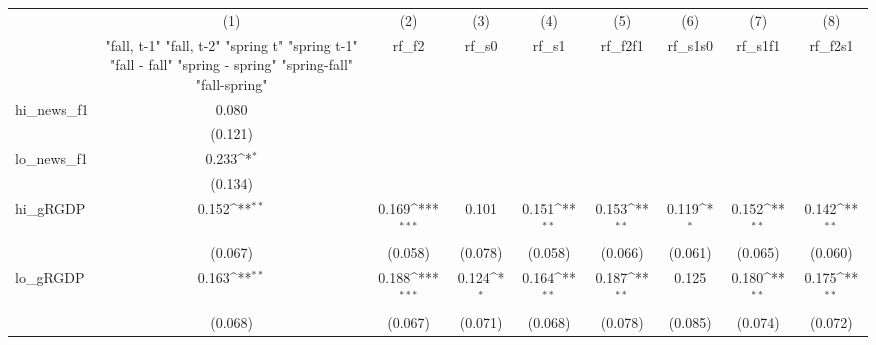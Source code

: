 {
\def\sym#1{\ifmmode^{#1}\else\(^{#1}\)\fi}
\begin{tabular}{l*{8}{c}}
\toprule
            &\multicolumn{1}{c}{(1)}&\multicolumn{1}{c}{(2)}&\multicolumn{1}{c}{(3)}&\multicolumn{1}{c}{(4)}&\multicolumn{1}{c}{(5)}&\multicolumn{1}{c}{(6)}&\multicolumn{1}{c}{(7)}&\multicolumn{1}{c}{(8)}\\
            &\multicolumn{1}{c}{  "fall, t-1" "fall, t-2" "spring t" "spring t-1"  "fall - fall" "spring - spring" "spring-fall" "fall-spring" }&\multicolumn{1}{c}{rf\_f2}&\multicolumn{1}{c}{rf\_s0}&\multicolumn{1}{c}{rf\_s1}&\multicolumn{1}{c}{rf\_f2f1}&\multicolumn{1}{c}{rf\_s1s0}&\multicolumn{1}{c}{rf\_s1f1}&\multicolumn{1}{c}{rf\_f2s1}\\
\midrule
hi\_news\_f1  &       0.080         &                     &                     &                     &                     &                     &                     &                     \\
            &     (0.121)         &                     &                     &                     &                     &                     &                     &                     \\
\addlinespace
lo\_news\_f1  &       0.233\sym{*}  &                     &                     &                     &                     &                     &                     &                     \\
            &     (0.134)         &                     &                     &                     &                     &                     &                     &                     \\
\addlinespace
hi\_gRGDP    &       0.152\sym{**} &       0.169\sym{***}&       0.101         &       0.151\sym{**} &       0.153\sym{**} &       0.119\sym{*}  &       0.152\sym{**} &       0.142\sym{**} \\
            &     (0.067)         &     (0.058)         &     (0.078)         &     (0.058)         &     (0.066)         &     (0.061)         &     (0.065)         &     (0.060)         \\
\addlinespace
lo\_gRGDP    &       0.163\sym{**} &       0.188\sym{***}&       0.124\sym{*}  &       0.164\sym{**} &       0.187\sym{**} &       0.125         &       0.180\sym{**} &       0.175\sym{**} \\
            &     (0.068)         &     (0.067)         &     (0.071)         &     (0.068)         &     (0.078)         &     (0.085)         &     (0.074)         &     (0.072)         \\

\end{tabular}}
